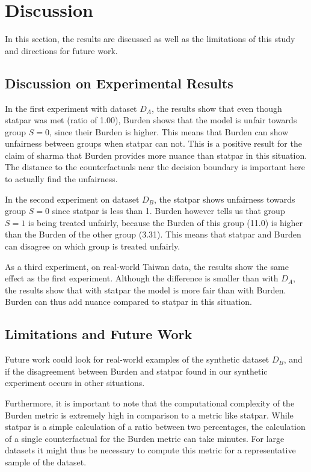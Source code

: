 \documentclass[runningheads]{llncs}
\begin{document}
\section{Discussion}\label{sec:discussion}

In this section, the results are discussed as well as the limitations of this study and directions for future work.

\subsection{Discussion on Experimental Results}
In the first experiment with dataset $D_A$, the results show that even though \gls{statpar} was met (ratio of 1.00), Burden shows that the model is unfair towards group $S=0$, since their Burden is higher. This means that Burden can show unfairness between groups when \gls{statpar} can not. This is a positive result for the claim of \gls{sharma} that \gls{Burden} provides more nuance than \gls{statpar} in this situation. The distance to the counterfactuals near the decision boundary is important here to actually find the unfairness.

In the second experiment on dataset $D_B$, the \gls{statpar} shows unfairness towards group $S=0$ since \gls{statpar} is less than 1. Burden however tells us that group $S=1$ is being treated unfairly, because the Burden of this group (11.0) is higher than the Burden of the other group (3.31). This means that \gls{statpar} and Burden can disagree on which group is treated unfairly.

As a third experiment, on real-world Taiwan data, the results show the same effect as the first experiment. Although the difference is smaller than with $D_A$, the results show that with \gls{statpar} the model is more fair than with Burden. Burden can thus add nuance compared to \gls{statpar} in this situation.

\subsection{Limitations and Future Work}
Future work could look for real-world examples of the synthetic dataset $D_B$, and if the disagreement between \gls{Burden} and \gls{statpar} found in our synthetic experiment occurs in other situations.

Furthermore, it is important to note that the computational complexity of the \gls{Burden} metric is extremely high in comparison to a metric like \gls{statpar}. While \gls{statpar} is a simple calculation of a ratio between two percentages, the calculation of a single counterfactual for the \gls{Burden} metric can take minutes. For large datasets it might thus be necessary to compute this metric for a representative sample of the dataset.
\end{document}
